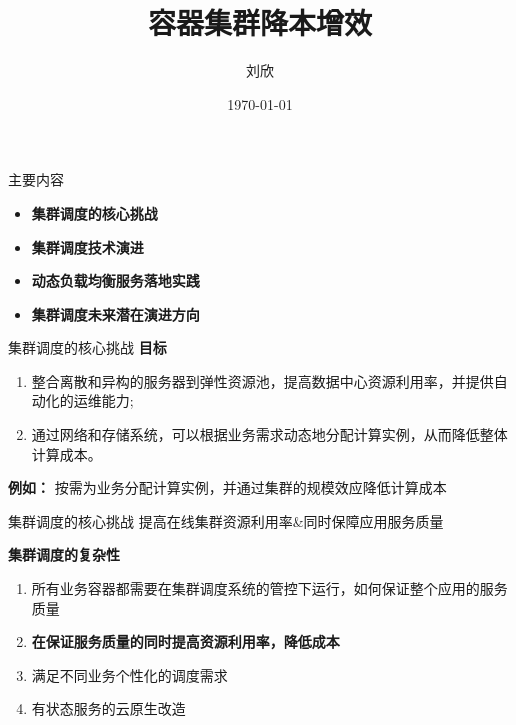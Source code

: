 \documentclass{beamer}
\title{容器集群降本增效}
\author{刘欣}
\date{\today}
\begin{document}
{ 
\frame{\titlepage}}



\begin{frame}{主要内容}
\begin{itemize}
  \item \textbf{集群调度的核心挑战}
  \newline
  \item \textbf{集群调度技术演进}
  \newline
   \item \textbf{动态负载均衡服务落地实践}
  \newline
  \item \textbf{集群调度未来潜在演进方向}
  \newline
\end{itemize}
\end{frame}

\begin{frame}{集群调度的核心挑战}
\textbf{目标}
\begin{enumerate}
\item 整合离散和异构的服务器到弹性资源池，提高数据中心资源利用率，并提供自动化的运维能力;
\item 通过网络和存储系统，可以根据业务需求动态地分配计算实例，从而降低整体计算成本。
\end{enumerate}

\textbf{例如：} 
\newline
\setlength\parindent{24pt} \indent 按需为业务分配计算实例，并通过集群的规模效应降低计算成本

\end{frame}

\begin{frame}{集群调度的核心挑战}
提高在线集群资源利用率\&同时保障应用服务质量

\textbf{集群调度的复杂性}
\begin{enumerate}
\item 所有业务容器都需要在集群调度系统的管控下运行，如何保证整个应用的服务质量
\item \textbf{在保证服务质量的同时提高资源利用率，降低成本}
\item 满足不同业务个性化的调度需求
\item 有状态服务的云原生改造
\end{enumerate}

\end{frame}
\end{document}
